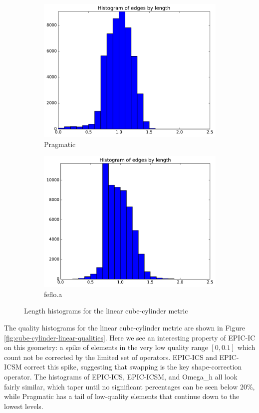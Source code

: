 \documentclass[3p,times,procedia,number]{elsarticle}
\begin{document}
\begin{figure}
\begin{subfigure}{.16\textwidth}
\includegraphics[width=\textwidth]{pragmatic-cube-cylinder-linear-length.pdf}
\caption{Pragmatic}
\end{subfigure}
\begin{subfigure}{.16\textwidth}
\centering
\includegraphics[width=\textwidth]{fefloa-cube-cylinder-linear-length.pdf}
\caption{feflo.a}
\end{subfigure}
\caption{Length histograms for the linear cube-cylinder metric}
\label{fig:cube-cylinder-linear-lengths}
\end{figure}

The quality histograms for the linear cube-cylinder metric
are shown in Figure \ref{fig:cube-cylinder-linear-qualities}.
Here we see an interesting property of EPIC-IC on this geometry:
a spike of elements in the very low quality range $[0,0.1]$
which count not be corrected by the limited set of operators.
EPIC-ICS and EPIC-ICSM correct this spike, suggesting that
swapping is the key shape-correction operator.
The histograms of EPIC-ICS, EPIC-ICSM, and Omega\_h all look fairly
similar, which taper until no significant percentages can be
seen below 20\%, while Pragmatic has a tail of low-quality
elements that continue down to the lowest levels.
\end{document}
